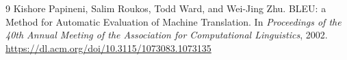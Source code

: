 \documentclass[11pt]{article}
\begin{document}
	\begin{thebibliography}{9}
		Kishore Papineni, Salim Roukos, Todd Ward, and Wei-Jing Zhu.
		\newblock BLEU: a Method for Automatic Evaluation of Machine Translation.
		\newblock In \emph{Proceedings of the 40th Annual Meeting of the Association for Computational Linguistics}, 2002.
		\newblock \url{https://dl.acm.org/doi/10.3115/1073083.1073135}
	\end{thebibliography}
\end{document}
